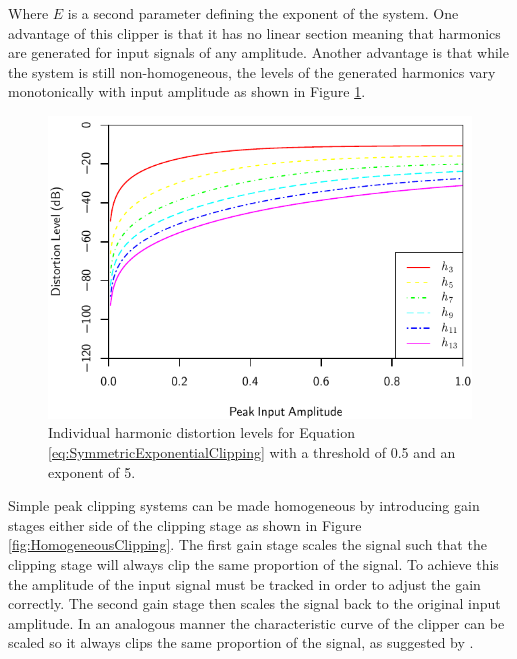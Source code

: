 			Where $E$ is a second parameter defining the exponent of the system. One advantage of this clipper
			is that it has no linear section meaning that harmonics are generated for input signals of any
			amplitude. Another advantage is that while the system is still non-homogeneous, the levels of the
			generated harmonics vary monotonically with input amplitude as shown in Figure
			\ref{fig:ExponentialClippingHarmonics}.

			\begin{figure}[h!]
				\centering
				\includegraphics{chapter5/Images/ExponentialClippingHarmonics.pdf}
				\caption{Individual harmonic distortion levels for Equation
					 \ref{eq:SymmetricExponentialClipping} with a threshold of 0.5 and an 
				         exponent of 5.}
				\label{fig:ExponentialClippingHarmonics}
			\end{figure}

			Simple peak clipping systems can be made homogeneous by introducing gain stages either side of the
			clipping stage as shown in Figure \ref{fig:HomogeneousClipping}. The first gain stage scales the
			signal such that the clipping stage will always clip the same proportion of the signal. To achieve
			this the amplitude of the input signal must be tracked in order to adjust the gain correctly. The
			second gain stage then scales the signal back to the original input amplitude. In an analogous
			manner the characteristic curve of the clipper can be scaled so it always clips the same proportion
			of the signal, as suggested by \citet{deman2014adaptive}.

